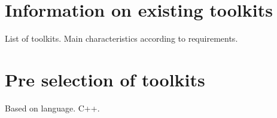 \section{Information on existing toolkits}
List of toolkits. Main characteristics according to requirements.
\section{Pre selection of toolkits}
Based on language. C++.